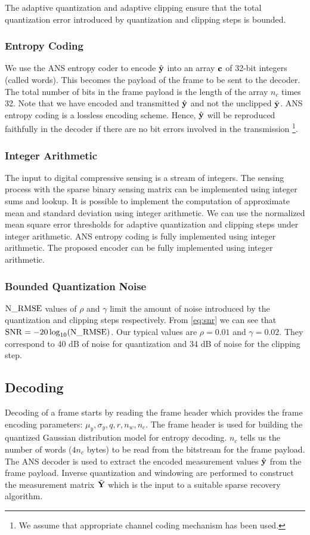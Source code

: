 The adaptive quantization and adaptive clipping ensure that
the total quantization error introduced by quantization and
clipping steps is bounded.

\subsubsection{Entropy Coding}
We use the ANS entropy coder to encode $\hat{\mathbf{y}}$ into an array
$\mathbf{c}$ of 32-bit integers (called words).
This becomes the payload of the frame to be sent to the decoder.
The total number of bits in the frame payload
is the length of the array $n_c$ times 32.
Note that we have encoded and transmitted $\hat{\mathbf{y}}$
and not the unclipped $\bar{\mathbf{y}}$. ANS entropy coding
is a lossless encoding scheme. Hence, $\hat{\mathbf{y}}$
will be reproduced faithfully in the decoder if there
are no bit errors involved in the transmission
\footnote{We assume that appropriate
channel coding mechanism has been used.}.

\subsubsection{Integer Arithmetic}
The input to digital compressive sensing is a stream of integers.
The sensing process with
the sparse binary sensing matrix can be implemented
using integer sums and lookup.
It is possible to implement the computation of
approximate mean and standard deviation
using integer arithmetic.
We can use the normalized mean square error thresholds
for adaptive quantization and clipping steps under integer arithmetic.
ANS entropy coding is fully implemented using integer arithmetic.
The proposed encoder can be fully implemented using integer arithmetic.

\subsubsection{Bounded Quantization Noise}
$\mathrm{N\_RMSE}$ values of $\rho$ and $\gamma$ limit
the amount of noise introduced by the quantization
and clipping steps respectively.
From \eqref{eq:snr} we can see that $\mathrm{SNR} = -20 \log_{10}(\mathrm{N\_RMSE})$.
Our typical values are $\rho=0.01$ and $\gamma=0.02$.
They correspond to 40 dB of noise for quantization
and 34 dB of noise for the clipping step.

\subsection{Decoding}
Decoding of a frame starts by reading the frame header
which provides the frame encoding parameters:
$\mu_y, \sigma_y, q, r, n_w, n_c$.
The frame header is used for building
the quantized Gaussian distribution model
for entropy decoding.
$n_c$ tells us the number of words ($4 n_c$ bytes) to be
read from the bitstream for the frame payload.
The ANS decoder is used to extract the encoded measurement
values $\hat{\mathbf{y}}$ from the frame payload.
Inverse quantization and windowing are performed
to construct the measurement matrix $\tilde{\mathbf{Y}}$
which is the input to a suitable sparse recovery algorithm.

